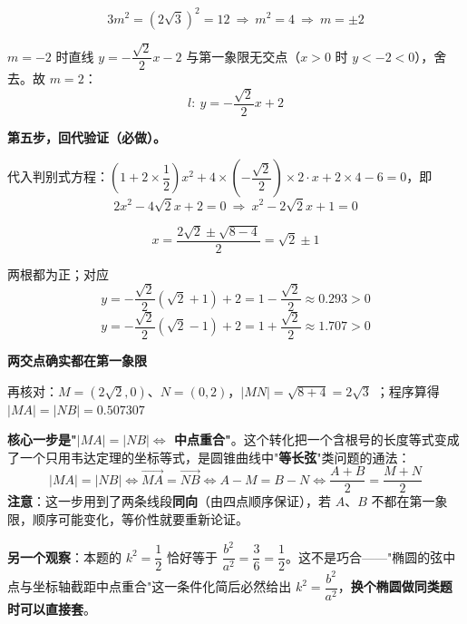 \begin{answer}
\nopagebreak[4]
\[3m^{2}=\left(2\sqrt3\right)^{2}=12\ \Longrightarrow\ m^{2}=4\ \Longrightarrow\ m=\pm2\]

$m=-2$ 时直线 $y=-\dfrac{\sqrt2}2x-2$ 与第一象限无交点（$x>0$ 时 $y<-2<0$），舍去。故 $m=2$：
\nopagebreak[4]
\[l:\ y=-\frac{\sqrt2}2x+2\]

\textbf{第五步，回代验证（必做）。}

代入判别式方程：$\left(1+2\times\dfrac12\right)x^{2}+4\times\left(-\dfrac{\sqrt2}2\right)\times2\cdot x+2\times4-6=0$，即
\nopagebreak[4]
\[2x^{2}-4\sqrt2x+2=0\ \Longrightarrow\ x^{2}-2\sqrt2x+1=0\]

\nopagebreak[4]
\[x=\frac{2\sqrt2\pm\sqrt{8-4}}2=\sqrt2\pm1\]

两根都为正；对应
\nopagebreak[4]
\[y=-\frac{\sqrt2}2\left(\sqrt2+1\right)+2=1-\frac{\sqrt2}2\approx0.293>0\]
\nopagebreak[4]
\[y=-\frac{\sqrt2}2\left(\sqrt2-1\right)+2=1+\frac{\sqrt2}2\approx1.707>0\]

\textbf{两交点确实都在第一象限} 

再核对：$M=\left(2\sqrt2,0\right)$、$N=(0,2)$，$|MN|=\sqrt{8+4}=2\sqrt3$ ；程序算得 $|MA|=|NB|=0.507307$ 

\begin{gktip}
\textbf{核心一步是"$|MA|=|NB|\Leftrightarrow$ 中点重合"}。这个转化把一个含根号的长度等式变成了一个只用韦达定理的坐标等式，是圆锥曲线中"\textbf{等长弦}"类问题的通法：
\nopagebreak[4]
\[|MA|=|NB|\iff\overrightarrow{MA}=\overrightarrow{NB}\iff A-M=B-N\iff\frac{A+B}2=\frac{M+N}2\]
\textbf{注意}：这一步用到了两条线段\textbf{同向}（由四点顺序保证），若 $A$、$B$ 不都在第一象限，顺序可能变化，等价性就要重新论证。

\textbf{另一个观察}：本题的 $k^{2}=\dfrac12$ 恰好等于 $\dfrac{b^{2}}{a^{2}}=\dfrac36=\dfrac12$。这不是巧合——"椭圆的弦中点与坐标轴截距中点重合"这一条件化简后必然给出 $k^{2}=\dfrac{b^{2}}{a^{2}}$，\textbf{换个椭圆做同类题时可以直接套}。
\end{gktip}


\par\medskip

\end{answer}

